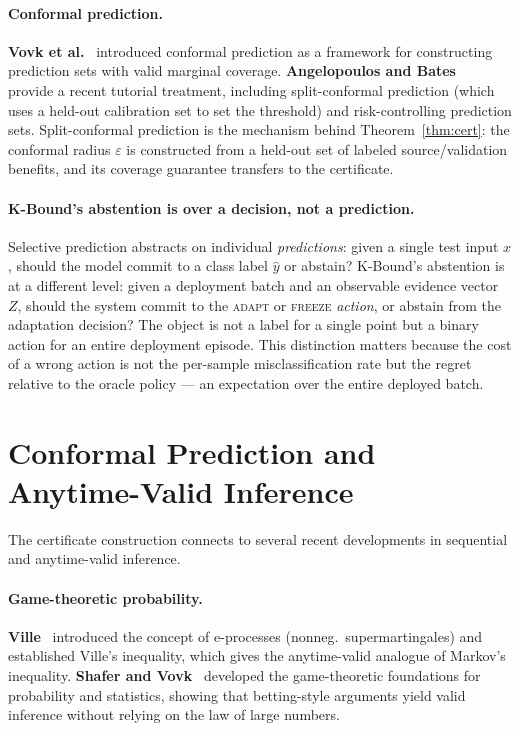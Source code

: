 \paragraph{Conformal prediction.}
\textbf{Vovk et al.}~\cite{vovk2005algorithmic} introduced conformal
prediction as a framework for constructing prediction sets with valid marginal
coverage.
\textbf{Angelopoulos and Bates}~\cite{angelopoulos2023conformal} provide a
recent tutorial treatment, including split-conformal prediction (which
uses a held-out calibration set to set the threshold) and risk-controlling
prediction sets.
Split-conformal prediction is the mechanism behind Theorem~\ref{thm:cert}:
the conformal radius $\varepsilon$ is constructed from a held-out set of
labeled source/validation benefits, and its coverage guarantee transfers to
the certificate.

\paragraph{K-Bound's abstention is over a decision, not a prediction.}
Selective prediction abstracts on individual \emph{predictions}: given a single
test input $x$, should the model commit to a class label $\hat{y}$ or abstain?
K-Bound's abstention is at a different level: given a deployment batch and an
observable evidence vector $Z$, should the system commit to the
\textsc{adapt} or \textsc{freeze} \emph{action}, or abstain from the
adaptation decision?
The object is not a label for a single point but a binary action for an entire
deployment episode.
This distinction matters because the cost of a wrong action is not the
per-sample misclassification rate but the regret relative to the oracle
policy --- an expectation over the entire deployed batch.

\section{Conformal Prediction and Anytime-Valid Inference}\label{sec:rel-conformal}

The certificate construction connects to several recent developments in
sequential and anytime-valid inference.

\paragraph{Game-theoretic probability.}
\textbf{Ville}~\cite{ville1939etude} introduced the concept of e-processes
(nonneg.\ supermartingales) and established Ville's inequality, which gives
the anytime-valid analogue of Markov's inequality.
\textbf{Shafer and Vovk}~\cite{shafer2019game} developed the game-theoretic
foundations for probability and statistics, showing that betting-style
arguments yield valid inference without relying on the law of large numbers.

